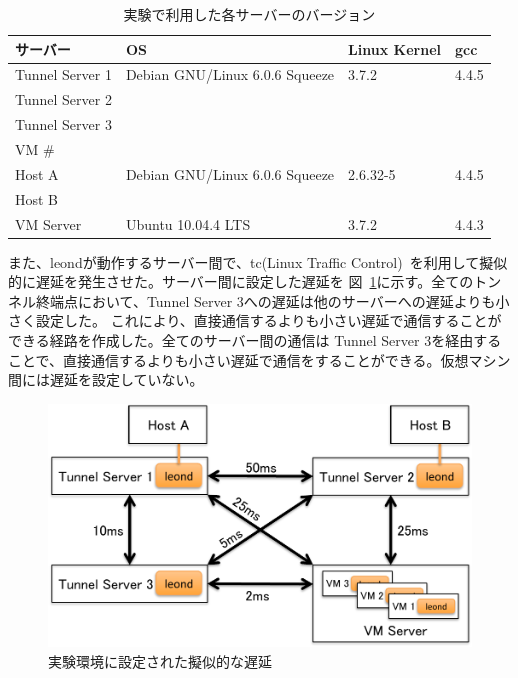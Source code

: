 \begin{table}[h]
\begin{center}
	\caption{実験で利用した各サーバーのバージョン}
	\begin{tabular}{|l|l|l|l|}
		\hline
		サーバー & OS & Linux Kernel & gcc \\
		\hline
		\hline
		Tunnel Server 1 & Debian GNU/Linux 6.0.6 Squeeze & 3.7.2 & 4.4.5 \\
		Tunnel Server 2 & 				 &       &       \\
		Tunnel Server 3	&				 &       &       \\
		VM \#		&				 & 	 &	 \\
		\hline
		Host A 		& Debian GNU/Linux 6.0.6 Squeeze & 2.6.32-5 & 4.4.5 \\
		Host B		&				 &	    &       \\
		\hline
		VM Server 	& Ubuntu 10.04.4 LTS		 & 3.7.2 & 4.4.3 \\
		\hline
	\end{tabular}
	\label{table:expversion}
\end{center}
\end{table}

また、leondが動作するサーバー間で、tc(Linux Traffic Control)~\cite{tc}を利用して擬似的に遅延を発生させた。サーバー間に設定した遅延を
図~\ref{img:experimenttc}に示す。全てのトンネル終端点において、Tunnel Server 3への遅延は他のサーバーへの遅延よりも小さく設定した。
これにより、直接通信するよりも小さい遅延で通信することができる経路を作成した。全てのサーバー間の通信は
Tunnel Server 3を経由することで、直接通信するよりも小さい遅延で通信をすることができる。仮想マシン間には遅延を設定していない。

\begin{figure}
	\begin{center}
		\includegraphics[scale=0.70]{./img/experimenttc}
		\caption{実験環境に設定された擬似的な遅延}
		\label{img:experimenttc}
	\end{center}
\end{figure}

